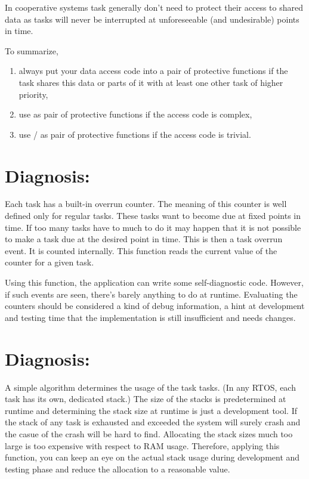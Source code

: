 In cooperative systems task generally don't need to protect their access
to shared data as tasks will never be interrupted at unforeseeable (and
undesirable) points in time.

To summarize, 
\begin{enumerate}
  \item always put your data access code into a pair of protective
    functions if the task shares this data or parts of it with at least
    one other task of higher priority,
  \item use  as pair of protective
    functions if the access code is complex,
  \item use / as pair of protective functions if the
    access code is trivial.
\end{enumerate}


\section{Diagnosis: }

Each task has a built-in overrun counter. The meaning of this counter is
well defined only for regular tasks. These tasks want to become due at
fixed points in time. If too many tasks have to much to do it may happen
that it is not possible to make a task due at the desired point in time.
This is then a task overrun event. It is counted internally. This function
reads the current value of the counter for a given task.

Using this function, the application can write some self-diagnostic code.
However, if such events are seen, there's barely anything to do at
runtime. Evaluating the counters should be considered a kind of debug
information, a hint at development and testing time that the
implementation is still insufficient and needs changes.


\section{Diagnosis: }

A simple algorithm determines the usage of the task tasks. (In any RTOS,
each task has its own, dedicated stack.) The size of the stacks is
predetermined at runtime and determining the stack size at runtime is just
a development tool. If the stack of any task is exhausted and exceeded the
system will surely crash and the casue of the crash will be hard to find.
Allocating the stack sizes much too large is too expensive with respect to
RAM usage. Therefore, applying this function, you can keep an eye on the
actual stack usage during development and testing phase and reduce the
allocation to a reasonable value.

